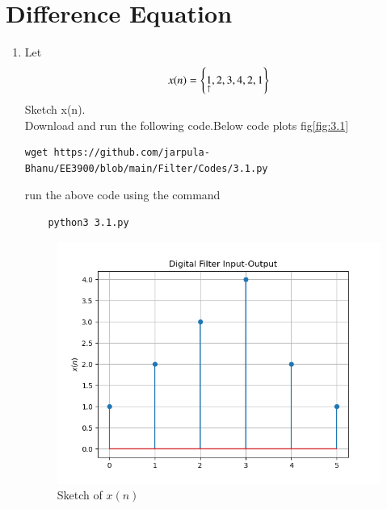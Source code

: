 \documentclass[journal,12pt,twocolumn]{IEEEtran}
\renewcommand\thesection{\arabic{section}}
\begin{document}
\section{Difference Equation}

\begin{enumerate}[label=\thesection.\arabic*
,ref=\thesection.\theenumi]
\item Let 
\begin{align}\label{3.1}
	x(n) = \left\{\underset{\uparrow}{1},2,3,4,2,1\right\}
\end{align}
Sketch x(n).\\
\solution Download and run the following code.Below code plots fig\eqref{fig:3.1}
\begin{lstlisting}
wget https://github.com/jarpula-Bhanu/EE3900/blob/main/Filter/Codes/3.1.py
\end{lstlisting}
run the above code using the command
\begin{lstlisting}
	python3 3.1.py
\end{lstlisting}
\begin{figure}[h]
    \centering
    \includegraphics[width=\columnwidth]{./figs/3.1.png}
    \caption{Sketch of $x(n)$}
    \label{fig:3.1}
\end{figure}


\end{enumerate}
\end{document}
